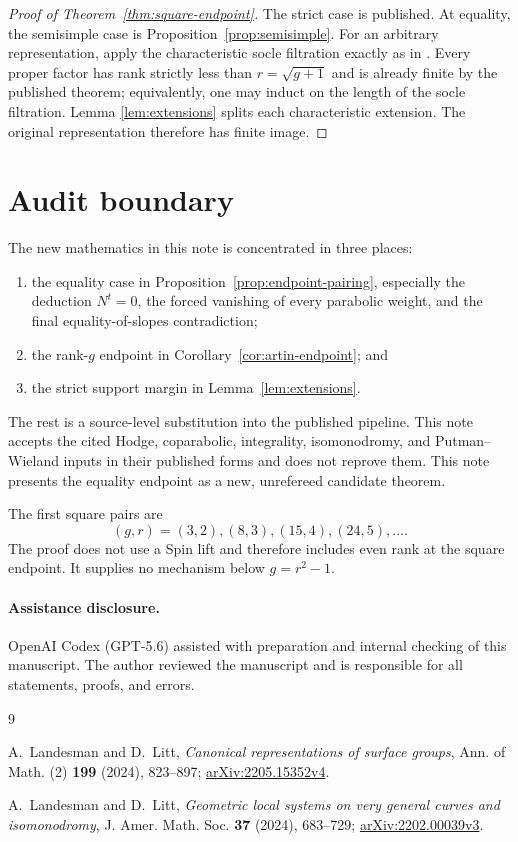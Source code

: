 \documentclass[11pt]{article}
\theoremstyle{definition}
\begin{document}
\begin{proof}[Proof of Theorem~\ref{thm:square-endpoint}]
The strict case is published.  At equality, the semisimple case is
Proposition~\ref{prop:semisimple}.  For an arbitrary representation, apply the
characteristic socle filtration exactly as in
\cite[Section~8.7]{LLCan}.  Every proper factor has rank strictly less than
$r=\sqrt{g+1}$ and is already finite by the published theorem; equivalently,
one may induct on the length of the socle filtration.  Lemma
\ref{lem:extensions} splits each characteristic extension.  The original
representation therefore has finite image.
\end{proof}

\section{Audit boundary}

The new mathematics in this note is concentrated in three places:

\begin{enumerate}
\item the equality case in Proposition~\ref{prop:endpoint-pairing}, especially the
deduction $N^t=0$, the forced vanishing of every parabolic weight, and the
final equality-of-slopes contradiction;
\item the rank-$g$ endpoint in Corollary~\ref{cor:artin-endpoint}; and
\item the strict support margin in Lemma~\ref{lem:extensions}.
\end{enumerate}

The rest is a source-level substitution into the published pipeline.  This
note accepts the cited Hodge, coparabolic, integrality, isomonodromy, and
Putman--Wieland inputs in their published forms and does not reprove them.
This note presents the equality endpoint as a new, unrefereed candidate
theorem.

The first square pairs are
\[
 (g,r)=(3,2),(8,3),(15,4),(24,5),\ldots.
\]
The proof does not use a Spin lift and therefore includes even rank at the
square endpoint.  It supplies no mechanism below $g=r^2-1$.

\paragraph{Assistance disclosure.}
OpenAI Codex (GPT-5.6) assisted with preparation and internal checking of this
manuscript.  The author reviewed the manuscript and is responsible for all
statements, proofs, and errors.

\begin{thebibliography}{9}

A.~Landesman and D.~Litt,
\emph{Canonical representations of surface groups},
Ann. of Math. (2) \textbf{199} (2024), 823--897;
\href{https://arxiv.org/abs/2205.15352}{arXiv:2205.15352v4}.

A.~Landesman and D.~Litt,
\emph{Geometric local systems on very general curves and isomonodromy},
J. Amer. Math. Soc. \textbf{37} (2024), 683--729;
\href{https://arxiv.org/abs/2202.00039}{arXiv:2202.00039v3}.

\end{thebibliography}
\end{document}
